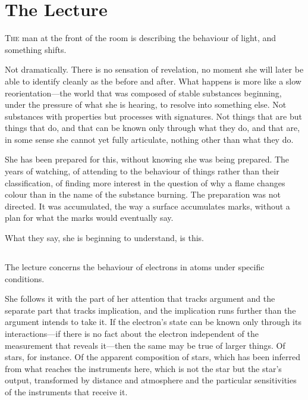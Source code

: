 
\chapter{The Lecture}


\lettrine{T}{he} man at the front of the room is describing
the behaviour of light, and something shifts.

Not dramatically. There is no sensation of revelation, no
moment she will later be able to identify cleanly as the
before and after. What happens is more like a slow
reorientation---the world that was composed of stable
substances beginning, under the pressure of what she is
hearing, to resolve into something else. Not substances
with properties but processes with signatures. Not things
that are but things that do, and that can be known only
through what they do, and that are, in some sense she
cannot yet fully articulate, nothing other than what
they do.

She has been prepared for this, without knowing she was
being prepared. The years of watching, of attending to
the behaviour of things rather than their classification,
of finding more interest in the question of why a flame
changes colour than in the name of the substance burning.
The preparation was not directed. It was accumulated, the
way a surface accumulates marks, without a plan for what
the marks would eventually say.

What they say, she is beginning to understand, is this.

\section{}

The lecture concerns the behaviour of electrons in atoms
under specific conditions.

She follows it with the part of her attention that
tracks argument and the separate part that tracks
implication, and the implication runs further than the
argument intends to take it. If the electron's state
can be known only through its interactions---if there
is no fact about the electron independent of the
measurement that reveals it---then the same may be
true of larger things. Of stars, for instance. Of
the apparent composition of stars, which has been
inferred from what reaches the instruments here, which
is not the star but the star's output, transformed by
distance and atmosphere and the particular sensitivities
of the instruments that receive it.

